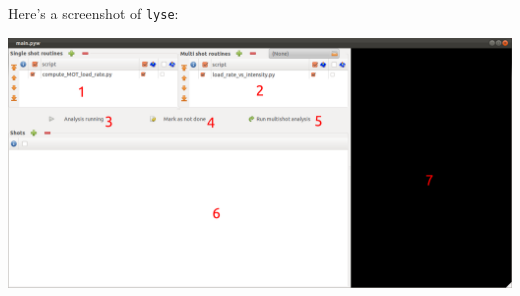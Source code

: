\documentclass[a4paper,11pt,titlepage]{article}
\begin{document}
Here's a screenshot of \texttt{lyse}:

\begin{center}
\includegraphics[width=\textwidth]{gui.pdf}
\end{center}
\end{document}
